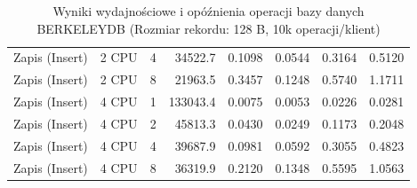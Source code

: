 \begin{table}[ht]
{\begin{tabular}{llcrrrrr}
Zapis (Insert) & 2 CPU & 4 & 34522.7 & 0.1098 & 0.0544 & 0.3164 & 0.5120 \\
Zapis (Insert) & 2 CPU & 8 & 21963.5 & 0.3457 & 0.1248 & 0.5740 & 1.1711 \\
Zapis (Insert) & 4 CPU & 1 & 133043.4 & 0.0075 & 0.0053 & 0.0226 & 0.0281 \\
Zapis (Insert) & 4 CPU & 2 & 45813.3 & 0.0430 & 0.0249 & 0.1173 & 0.2048 \\
Zapis (Insert) & 4 CPU & 4 & 39687.9 & 0.0981 & 0.0592 & 0.3055 & 0.4823 \\
Zapis (Insert) & 4 CPU & 8 & 36319.9 & 0.2120 & 0.1348 & 0.5595 & 1.0563 \\
\bottomrule
\end{tabular}%
}
\caption{Wyniki wydajnościowe i opóźnienia operacji bazy danych BERKELEYDB (Rozmiar rekordu: 128 B, 10k operacji/klient)}
\label{tab:latency_berkeleydb_small_10000}
\end{table}
